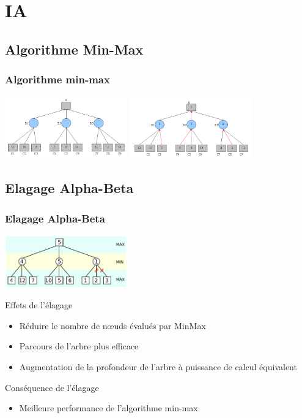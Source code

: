 \documentclass[11pt]{beamer}
\begin{document}
\section{IA}
\subsection{Algorithme Min-Max} 
  \begin{frame}
  \frametitle{Algorithme min-max}
  \centering
\includegraphics[width=150pt]{images/minmax.png}
\includegraphics[width=150pt]{images/minmax2.png}
  \end{frame}
\subsection{Elagage Alpha-Beta} 
  \begin{frame}
  \frametitle{Elagage Alpha-Beta}
\centering \includegraphics[width=150pt]{images/alphabeta.png}
\begin{block}{Effets de l'élagage}
            \begin{itemize}
                \item Réduire le nombre de nœuds évalués par MinMax
                \item Parcours de l'arbre plus efficace
                \item Augmentation de la profondeur de l'arbre à puissance de calcul équivalent
            \end{itemize}
\end{block}

\begin{alertblock}{Conséquence  de l'élagage}
            \begin{itemize}
      
                \item Meilleure performance de l'algorithme min-max
            \end{itemize}
\end{alertblock}



  \end{frame}  
  
\end{document}
